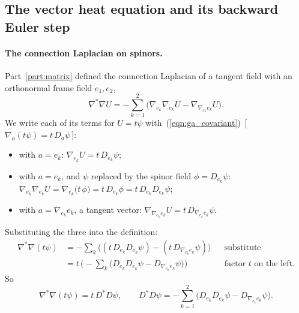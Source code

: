 \subsection{The vector heat equation and its backward Euler step}

\paragraph{The connection Laplacian on spinors.} Part~\ref{part:matrix} defined the connection Laplacian of a tangent field with an orthonormal frame field $e_1, e_2$,
\begin{equation*}
\nabla^*\nabla U = -\sum_{k=1}^2 \big(\nabla_{e_k}\nabla_{e_k} U - \nabla_{\nabla_{e_k} e_k} U\big) .
\end{equation*}
We write each of its terms for $U = t\psi$ with~(\ref{eqn:ga_covariant})~[\,$\nabla_a(t\psi) = t\,D_a\psi$\,]:
\begin{itemize}
\item with $a = e_k$: $\nabla_{e_k} U = t\, D_{e_k}\psi$;
\item with $a = e_k$, and $\psi$ replaced by the spinor field $\phi = D_{e_k}\psi$: $\nabla_{e_k}\nabla_{e_k} U = \nabla_{e_k}\big(t\,\phi\big) = t\, D_{e_k}\phi = t\, D_{e_k}D_{e_k}\psi$;
\item with $a = \nabla_{e_k}e_k$, a tangent vector: $\nabla_{\nabla_{e_k}e_k}U = t\,D_{\nabla_{e_k}e_k}\psi$.
\end{itemize}
Substituting the three into the definition:
\begin{align*}
\nabla^*\nabla(t\psi) &= -\sum_k \big( (t\, D_{e_k}D_{e_k}\psi) - (t\, D_{\nabla_{e_k}e_k}\psi) \big) && \text{substitute} \\
&= t\,\Big(-\sum_k \big(D_{e_k}D_{e_k}\psi - D_{\nabla_{e_k}e_k}\psi\big)\Big) && \text{factor } t \text{ on the left.}
\end{align*}
So
\begin{equation}
\label{eqn:r2_DstarD}
\nabla^*\nabla (t\psi) = t\, D^*D\psi, \qquad D^*D\psi = -\sum_{k=1}^2 \big(D_{e_k}D_{e_k}\psi - D_{\nabla_{e_k}e_k}\psi\big) .
\end{equation}

